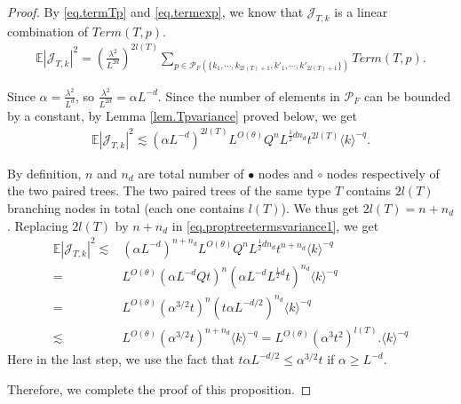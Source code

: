 \begin{proof}
By \eqref{eq.termTp} and \eqref{eq.termexp}, we know that $\mathcal{J}_{T,k}$ is a linear combination of $Term(T,p)$.
\begin{equation}
\begin{split}
    \mathbb{E}|\mathcal{J}_{T,k}|^2=\left(\frac{\lambda^2}{L^{2d}}\right)^{2l(T)}
    \sum_{p\in \mathcal{P}_F(\{k_1,\cdots, k_{2l(T)+1}, k'_1,\cdots, k'_{2l(T)+1}\})} Term(T, p).
\end{split}
\end{equation}

Since $\alpha=\frac{\lambda^2}{L^{d}}$, so $\frac{\lambda^2}{L^{2d}}=\alpha L^{-d}$. Since the number of elements in $\mathcal{P}_F$ can be bounded by a constant, by Lemma \ref{lem.Tpvariance} proved below, we get
\begin{equation}\label{eq.proptreetermsvariance1}
\begin{split}
    \mathbb{E}|\mathcal{J}_{T,k}|^2\lesssim (\alpha L^{-d})^{2l(T)}
    L^{O(\theta)} Q^{n} L^{\frac{1}{2} dn_d} t^{2l(T)} \langle k\rangle^{-q}.
\end{split}
\end{equation}

By definition, $n$ and $n_d$ are total number of $\bullet$ nodes and $\circ$ nodes respectively of the two paired trees. The two paired trees of the same type $T$ contains $2l(T)$ branching nodes in total (each one contains $l(T)$). We thus get $2l(T)=n+n_d$. Replacing $2l(T)$ by $n+n_d$ in \eqref{eq.proptreetermsvariance1}, we get
\begin{equation}
\begin{split}
    \mathbb{E}|\mathcal{J}_{T,k}|^2\lesssim& (\alpha L^{-d})^{n+n_d}
    L^{O(\theta)} Q^{n} L^{\frac{1}{2} dn_d} t^{n+n_d} \langle k\rangle^{-q}
    \\
    =& L^{O(\theta)} (\alpha L^{-d} Qt)^{n} (\alpha L^{-d}L^{\frac{1}{2} d}t)^{n_d}\langle k\rangle^{-q}
    \\
    =& L^{O(\theta)} (\alpha^{3/2} t)^{n} (t\alpha L^{-d/2})^{n_d}\langle k\rangle^{-q}
    \\
    \lesssim& L^{O(\theta)} (\alpha^{3/2} t)^{n+n_d} \langle k\rangle^{-q}= L^{O(\theta)} (\alpha^{3} t^2)^{l(T)}. \langle k\rangle^{-q}
\end{split}
\end{equation}
Here in the last step, we use the fact that $t\alpha L^{-d/2}\le \alpha^{3/2} t$ if $\alpha\ge L^{-d} $.

Therefore, we complete the proof of this proposition.
\end{proof}


